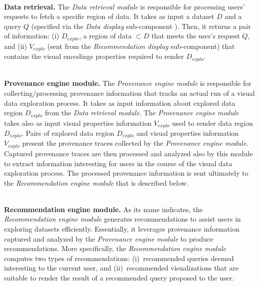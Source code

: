 ~~\\
\noindent \textbf{Data retrieval.}
{\color{Fuchsia}
The \emph{Data retrieval module} is responsible for processing users' requests to fetch a specific region of data. 
It takes as input a dataset $D$ and a query $Q$ (specified via the \emph{Data display} sub-component
).
Then, it returns a pair of information: (i) $D_{explo}$, a region of data $ \subset D$ that meets the user's request $Q$, and (ii)  $V_{explo}$ (sent from the \emph{Recommendation display} sub-component) that contains the visual encodings properties required to render $D_{explo}$.
}

~~\\
\noindent \textbf{Provenance engine module.}
The \emph{Provenance engine module} is responsible for collecting/processing provenance information that tracks an actual run of a visual data exploration process.
It takes as input information about explored data region $D_{explo}$ from the \emph{Data retrieval module}. 
{\color{Fuchsia}The \emph{Provenance engine module} takes also as input visual properties information $V_{explo}$ used to render data region $D_{explo}$.
Pairs of explored data region $D_{explo}$ and visual properties information $V_{explo}$ present the provenance traces collected by the \emph{Provenance engine module}.} Captured provenance traces are then processed and analyzed also by this module to extract information interesting for users in the course of the visual data exploration process. 
The processed provenance information is sent ultimately to the \emph{Recommendation engine module} that is described below.



~~\\
\noindent \textbf{Recommendation engine module.} 
As its name indicates, the \emph{Recommendation engine module} generates recommendations to assist users in exploring datasets efficiently. Essentially, it leverages provenance information captured and analyzed by the \emph{Provenance engine module} to produce recommendations.
More specifically, the \emph{Recommendation engine module} computes two types of recommendations:  (i)~recommended queries deemed interesting to the current user, and (ii)~recommended visualizations that are suitable 
to render the result of a recommended query proposed to the user.


